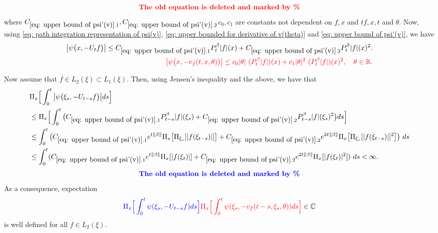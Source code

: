 \documentclass[12pt,oneside,english]{amsart}
\theoremstyle{plain}
\theoremstyle{definition}
\numberwithin{equation}{section}
\newcommand{\added}[1]{{\color{blue}#1}}\newcommand{\deleted}[1]{{\color{red}#1}}
\begin{document}
\begin{equation}
\deleted{ \textbf{The old equation is deleted and marked by \%}}
\end{equation}
    where \added{$C_{\ref{eq: upper bound of psi'(v)}.1}, C_{\ref{eq: upper bound of psi'(v)}.2}$}\deleted{$c_0,c_1$} are constants not dependent on \added{$f,x$ and $t$}\deleted{$f,x,t$ and $\theta$}.
    Now, using \eqref{eq: path integration representation of psi(v)}, \eqref{eq: upper bounded for derivative of v(theta)} and \eqref{eq: upper bound of psi'(v)}, we have
\deleted{
\begin{align}
\label{eq: upper bound of psi(v)}
    \big|\psi\big(x,-U_tf\big)\big|
    \leq C_{\ref{eq: upper bound of psi'(v)}.1} P^\beta_t |f|(x)+C_{\ref{eq: upper bound of psi'(v)}.2} P^\beta_t |f| (x)^2.
    \\ \deleted{\big|\psi\big(x,-v_f(t,x,\theta)\big)\big|
    \leq c_0|\theta|~(P^\beta_t |f|)(x)+c_1 |\theta|^2 ~(P^\beta_t |f|)(x)^2,
    \quad \theta \in \mathbb R.}
\end{align}
}

    Now assume that $f \in L_2(\xi) \subset L_1(\xi)$.
    Then, using Jensen's inequality and the above, we have that
\deleted{
\begin{align}
\label{eq: domination of psi(v)}
    &\Pi_x\Big[\int_0^t \big|\psi \big(\xi_s,-U_{t-s}f\big)\big|ds\Big]
    \\&\leq \Pi_x\Big[\int_0^t \big(C_{\ref{eq: upper bound of psi'(v)}.1} P_{t-s}^\beta|f|(\xi_s)+C_{\ref{eq: upper bound of psi'(v)}.2} P_{t-s}^\beta|f|(\xi_s)^2\big)ds\Big]
    \\ &\leq \int_0^t \big(C_{\ref{eq: upper bound of psi'(v)}.1} e^{t\|\beta\|}\Pi_x \big[ \Pi_{\xi_s}[|f(\xi_{t-s})|] \big]+C_{\ref{eq: upper bound of psi'(v)}.2} e^{2t\|\beta\|}\Pi_x \big[ \Pi_{\xi_s}[|f (\xi_{t-s})|]^2 \big]\big)~ds
    \\ &\leq \int_0^t (C_{\ref{eq: upper bound of psi'(v)}.1} e^{t\|\beta\|}\Pi_x [ |f(\xi_{t})|]+C_{\ref{eq: upper bound of psi'(v)}.2}e^{2t\|\beta\|}\Pi_x [ |f (\xi_{t})|^2 ])~ds < \infty.
\end{align}
}
\begin{align}
    \added{ \textbf{The old equation is deleted and marked by \%}}
\end{align}
    As a consequence, expectation
\[
    \added{ \Pi_x\Big[\int_0^t \psi(\xi_s,-U_{t-s}f)ds\Big]}
    \deleted{\Pi_x\Big[\int_0^t \psi(\xi_s,-v_f(t-s,\xi_s,\theta))ds\Big]}
    \in \mathbb C
\]
    is well defined for all $f\in L_2(\xi)$.
\end{document}
